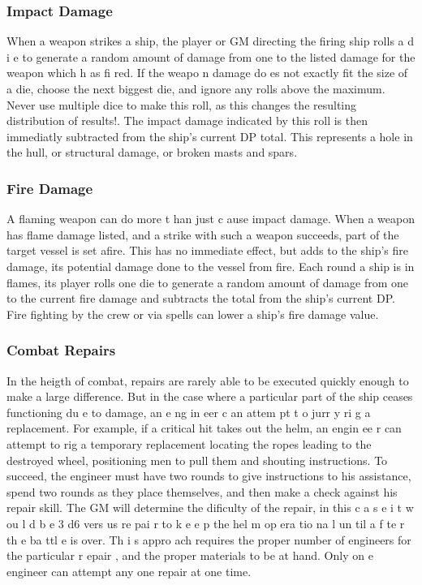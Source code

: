 \begin{multicols*}{2}
\subsubsection{Impact Damage}
When a weapon strikes a ship, the player or GM
directing the firing ship rolls a d i e to generate a random
amount of damage from one to the listed damage for the
weapon which h as fi red. If the weapo n damage do es not
exactly fit the size of a die, choose the next biggest die, and
ignore any rolls above the maximum. Never use multiple dice
to make this roll, as this changes the resulting distribution of
results!.
The impact damage indicated by this roll is then
immediatly subtracted from the ship's current DP total. This
represents a hole in the hull, or structural damage, or broken
masts and spars.
\subsubsection{Fire Damage}
A flaming weapon can do more t han just c ause
impact damage. When a weapon has flame damage listed, and
a strike with such a weapon succeeds, part of the target vessel
is set afire. This has no immediate effect, but adds to the
ship's fire damage, its potential damage done to the vessel
from fire. Each round a ship is in flames, its player rolls one
die to generate a random amount of damage from one to the
current fire damage and subtracts the total from the ship's
current DP. Fire fighting by the crew or via spells can lower a
ship's fire damage value.
\subsubsection{Combat Repairs}
In the heigth of combat, repairs are rarely able to be
executed quickly enough to make a large difference. But in
the case where a particular part of the ship ceases functioning
du e to damage, an e ng in eer c an attem pt t o jurr y ri g a
replacement. For example, if a critical hit takes out the helm,
an engin ee r can attempt to rig a temporary replacement
locating the ropes leading to the destroyed wheel, positioning
men to pull them and shouting instructions.
To succeed, the engineer must have two rounds to
give instructions to his assistance, spend two rounds as they
place themselves, and then make a check against his repair
skill. The GM will determine the dificulty of the repair, in this
c a s e i t w ou l d b e 3 d6 vers us re pai r to k e e p the hel m
op era tio na l un til a f te r th e ba ttl e is over. Th i s appro ach
requires the proper number of engineers for the particular
r epair , and the proper materials to be at hand. Only on e
engineer can attempt any one repair at one time.

\end{multicols*}
